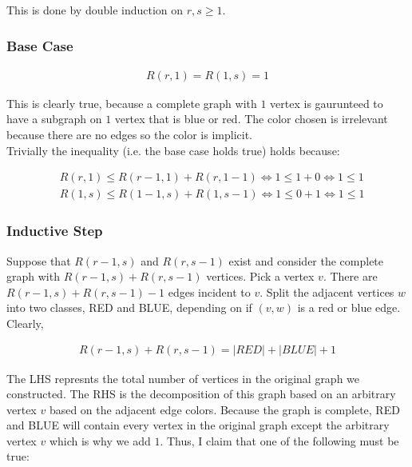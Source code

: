 \documentclass{report}
\begin{document}
\begin{subproof}
    This is done by double induction on $r,s \ge 1$. \\

    \subsubsection*{Base Case}

    \begin{align*}
        R(r,1) = R(1,s)= 1
    \end{align*}

    This is clearly true, because a complete graph with $1$ vertex is gaurunteed to have a
    subgraph on $1$ vertex that is blue or red. The color chosen is irrelevant because there are no edges
    so the color is implicit. \\

    Trivially the inequality (i.e. the base case holds true) holds because:

    \begin{align*}
         & R(r,1) \le R(r-1,1) + R(r,1-1) \iff 1 \le 1 + 0 \iff 1 \le 1 \\
         & R(1,s) \le R(1-1,s) + R(1,s-1) \iff 1 \le 0 + 1 \iff 1 \le 1
    \end{align*}

    \subsubsection*{Inductive Step}

    Suppose that $R(r-1,s)$ and $R(r,s-1)$ exist and consider the complete graph with
    $R(r-1,s) + R(r,s-1)$ vertices. Pick a vertex $v$. There are $R(r-1,s) + R(r,s-1) - 1$
    edges incident to $v$. Split the adjacent vertices $w$ into two classes, RED and BLUE,
    depending on if $(v,w)$ is a red or blue edge. Clearly,

    \begin{align*}
        R(r-1,s) + R(r,s-1) = |RED| + |BLUE| + 1
    \end{align*}

    The LHS represnts the total number of vertices in the original graph we constructed. The RHS is the
    decomposition of this graph based on an arbitrary vertex $v$ based on the adjacent edge
    colors. Because the graph is complete, RED and BLUE will contain every vertex in the original
    graph except the arbitrary vertex $v$ which is why we add $1$. Thus, I claim that one of the
    following must be true:


\end{subproof}
\end{document}
